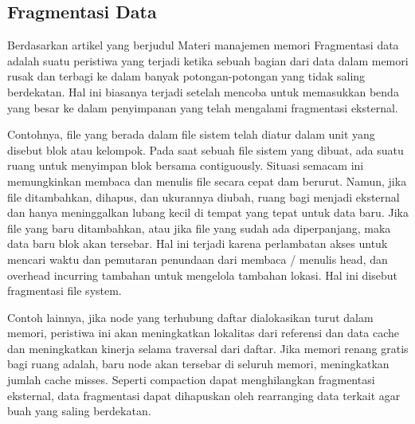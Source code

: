 \subsection{Fragmentasi Data}
Berdasarkan artikel yang berjudul Materi manajemen memori \cite{tawarmateri} Fragmentasi data adalah suatu peristiwa  yang terjadi ketika sebuah bagian dari data dalam memori rusak dan terbagi ke dalam banyak potongan-potongan yang tidak saling berdekatan. Hal ini biasanya terjadi setelah mencoba untuk memasukkan benda yang besar ke dalam penyimpanan yang telah mengalami fragmentasi eksternal.
    
Contohnya, file yang berada dalam file sistem telah diatur dalam unit yang disebut blok atau kelompok. Pada saat sebuah file sistem yang dibuat, ada suatu ruang untuk menyimpan blok bersama contiguously. Situasi semacam ini memungkinkan membaca dan menulis file secara cepat dam berurut. Namun, jika file ditambahkan, dihapus, dan ukurannya diubah, ruang bagi menjadi eksternal dan hanya meninggalkan lubang kecil di tempat yang tepat untuk data baru. Jika file yang baru ditambahkan, atau jika file yang sudah ada diperpanjang, maka data baru blok akan tersebar. Hal ini terjadi karena perlambatan akses untuk mencari waktu dan pemutaran penundaan dari membaca / menulis head, dan overhead incurring tambahan untuk mengelola tambahan lokasi. Hal ini disebut fragmentasi file system.

Contoh lainnya, jika node yang terhubung daftar dialokasikan turut dalam memori, peristiwa ini akan meningkatkan lokalitas dari referensi dan data cache dan meningkatkan kinerja selama traversal dari daftar. Jika memori renang gratis bagi ruang adalah, baru node akan tersebar di seluruh memori, meningkatkan jumlah cache misses.
Seperti compaction dapat menghilangkan fragmentasi eksternal, data fragmentasi dapat dihapuskan oleh rearranging data terkait agar buah yang saling berdekatan. 
